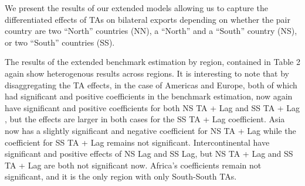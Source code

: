 We present the results of our extended models allowing us to capture the
differentiated effects of TAs on bilateral exports depending on whether
the pair country are two ``North'' countries (NN), a ``North'' and a
``South'' country (NS), or two ``South'' countries (SS).

The results of the extended benchmark estimation by region, contained in
Table 2 again show heterogenous results across regions. It is
interesting to note that by disaggregating the TA effects, in the case
of Americas and Europe, both of which had significant and positive
coefficients in the benchmark estimation, now again have significant and
positive coefficients for both NS TA + Lag and SS TA + Lag , but the
effects are larger in both cases for the SS TA + Lag coefficient. Asia
now has a slightly significant and negative coefficient for NS TA + Lag
while the coefficient for SS TA + Lag remains not significant.
Intercontinental have significant and positive effects of NS Lag and SS
Lag, but NS TA + Lag and SS TA + Lag are both not significant now.
Africa's coefficients remain not significant, and it is the only region
with only South-South TAs.
